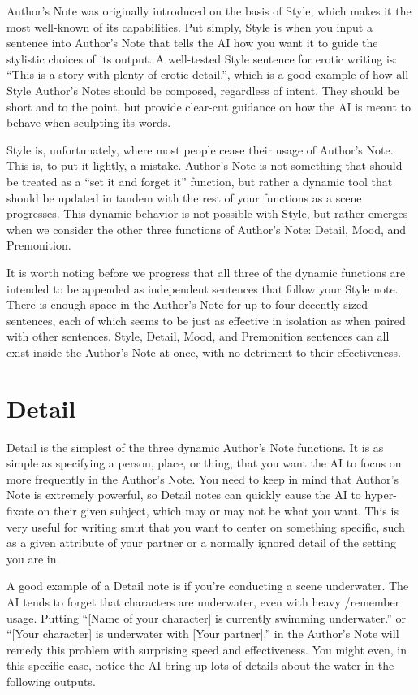 \documentclass[Source-main.tex]{subfiles}
\begin{document}
Author’s Note was originally introduced on the basis of Style, which makes it the most well-known of its capabilities.
Put simply, Style is when you input a sentence into Author’s Note that tells the AI how you want it to guide the stylistic choices of its output.
A well-tested Style sentence for erotic writing is: “This is a story with plenty of erotic detail.”, which is a good example of how all Style Author’s Notes should be composed, regardless of intent.
They should be short and to the point, but provide clear-cut guidance on how the AI is meant to behave when sculpting its words.

Style is, unfortunately, where most people cease their usage of Author’s Note.
This is, to put it lightly, a mistake.
Author’s Note is not something that should be treated as a “set it and forget it” function, but rather a dynamic tool that should be updated in tandem with the rest of your functions as a scene progresses.
This dynamic behavior is not possible with Style, but rather emerges when we consider the other three functions of Author’s Note: Detail, Mood, and Premonition.

It is worth noting before we progress that all three of the dynamic functions are intended to be appended as independent sentences that follow your Style note.
There is enough space in the Author’s Note for up to four decently sized sentences, each of which seems to be just as effective in isolation as when paired with other sentences.
Style, Detail, Mood, and Premonition sentences can all exist inside the Author’s Note at once, with no detriment to their effectiveness.

\section{Detail}

Detail is the simplest of the three dynamic Author’s Note functions.
It is as simple as specifying a person, place, or thing, that you want the AI to focus on more frequently in the Author’s Note.
You need to keep in mind that Author’s Note is extremely powerful, so Detail notes can quickly cause the AI to hyper-fixate on their given subject, which may or may not be what you want.
This is very useful for writing smut that you want to center on something specific, such as a given attribute of your partner or a normally ignored detail of the setting you are in.

A good example of a Detail note is if you’re conducting a scene underwater.
The AI tends to forget that characters are underwater, even with heavy /remember usage.
Putting “[Name of your character] is currently swimming underwater.” or “[Your character] is underwater with [Your partner].” in the Author’s Note will remedy this problem with surprising speed and effectiveness.
You might even, in this specific case, notice the AI bring up lots of details about the water in the following outputs.
\end{document}
